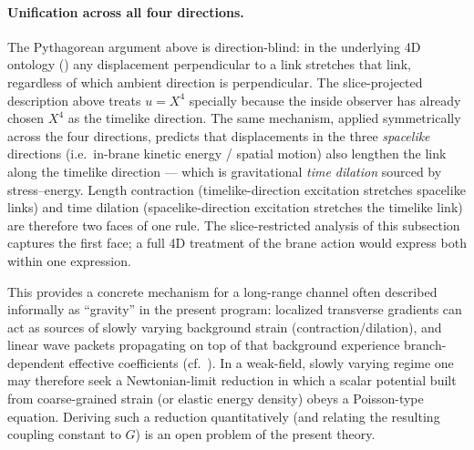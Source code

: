 \paragraph{Unification across all four directions.}
The Pythagorean argument above is direction-blind: in the underlying 4D ontology () any displacement perpendicular to a link stretches that link, regardless of which ambient direction is perpendicular.
The slice-projected description above treats $u=X^4$ specially because the inside observer has already chosen $X^4$ as the timelike direction.
The same mechanism, applied symmetrically across the four directions, predicts that displacements in the three \emph{spacelike} directions (i.e.\ in-brane kinetic energy / spatial motion) also lengthen the link along the timelike direction --- which is gravitational \emph{time dilation} sourced by stress--energy.
Length contraction (timelike-direction excitation stretches spacelike links) and time dilation (spacelike-direction excitation stretches the timelike link) are therefore two faces of one rule.
The slice-restricted analysis of this subsection captures the first face; a full 4D treatment of the brane action would express both within one expression.

This provides a concrete mechanism for a long-range channel often described informally as ``gravity'' in the present
program: localized transverse gradients can act as sources of slowly varying background strain (contraction/dilation),
and linear wave packets propagating on top of that background experience branch-dependent effective coefficients
(cf.\ ).
In a weak-field, slowly varying regime one may therefore seek a Newtonian-limit reduction in which a scalar potential
built from coarse-grained strain (or elastic energy density) obeys a Poisson-type equation.
Deriving such a reduction quantitatively (and relating the resulting coupling constant to $G$) is an open problem of
the present theory.
